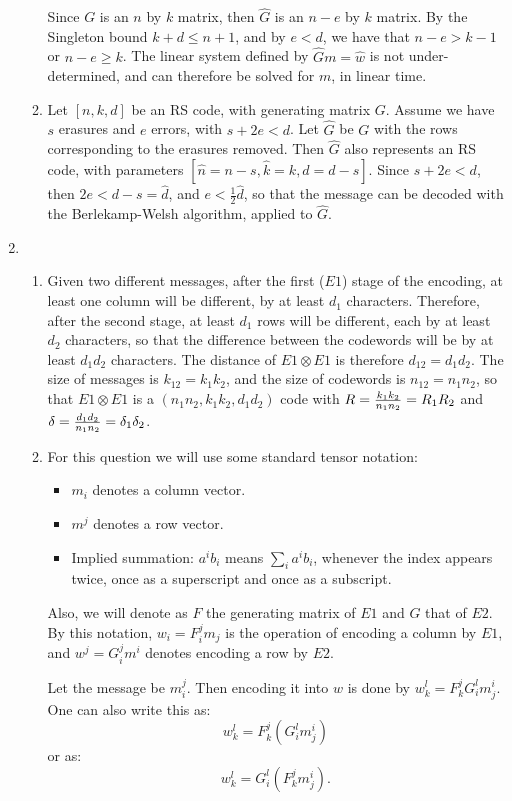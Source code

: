 \documentclass[11pt]{article} \usepackage{amssymb}
\newcommand{\half}{{\textstyle \frac12}}
\begin{document}
\begin{enumerate}
\begin{enumerate}
Since $G$ is an $n$ by $k$ matrix, then $\hat{G}$ is an $n-e$ by $k$
matrix. By the Singleton bound $k+d\leq n+1$, and by $e<d$, we 
have that $n-e>k-1$ or $n-e\geq k$. The
linear system defined by  $\hat{G}m=\hat{w}$ is not under-determined,
and can therefore be solved for $m$, in linear time.
\item
Let $[n,k,d]$ be an RS code, with generating matrix $G$. 
Assume we have $s$ erasures and $e$ errors, with $s+2e<d$. Let $\hat{G}$
be $G$ with the rows corresponding to the erasures removed. Then
$\hat{G}$ also represents an RS code, with parameters 
$[\hat{n}=n-s, \hat{k}=k, \hat{d}=d-s]$. Since $s+2e<d$, then 
$2e<d-s=\hat{d}$, and $e<\half\hat{d}$, so that the message can be
decoded with the Berlekamp-Welsh algorithm, applied to $\hat{G}$.
\end{enumerate}
\item
\begin{enumerate}
\item
Given two different messages, after the first ($E1$) stage of
the encoding, at least one column will be different, by at least
$d_1$ characters. Therefore, after the second stage,
at least $d_1$ rows will be different, each by at least $d_2$
characters, so that the difference between the codewords 
will be by at least $d_1d_2$ characters.
The distance of $E1\otimes E1$ is therefore $d_{12}=d_1d_2$. 
The size of messages is $k_{12}=k_1k_2$, and the
size of codewords is $n_{12}=n_1n_2$, so that $E1\otimes E1$ is a
$(n_1n_2,k_1k_2,d_1d_2)$ code with $R={k_1k_2\over n_1n_2}=R_1R_2$
and $\delta = {d_1d_2\over n_1n_2}=\delta_1\delta_2$.
\item
For this question we will use some standard tensor notation:
\begin{itemize}
\item $m_i$ denotes a column vector.
\item $m^j$ denotes a row vector.
\item Implied summation: $a^ib_i$ means
  $\sum_ia^ib_i$, whenever the index appears twice, once as a superscript
  and once as a subscript.
\end{itemize}
 Also, we will denote as $F$ the generating matrix of $E1$ and $G$ that 
of $E2$. 
By this notation, $w_i=F_i^jm_j$ is the operation
of encoding a column by $E1$, and $w^j=G^j_im^i$ denotes encoding
a row by $E2$.

Let the message be $m_i^j$. Then encoding it into $w$ is done 
by $w_k^l=F_k^jG_i^lm_j^i$. One can also write this as: 
\begin{equation}
  \label{eq:col_en}
w_k^l=F_k^j(G_i^lm_j^i)  
\end{equation}
or as:
\begin{equation}
  \label{eq:row_en}
w_k^l=G_i^l(F_k^jm_j^i).
\end{equation}


\end{enumerate}
\end{enumerate}
\end{document}
